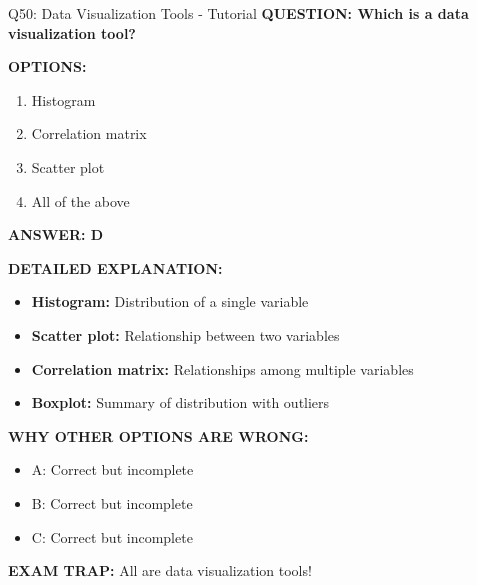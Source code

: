 \documentclass[8pt]{beamer}
\begin{document}
	\begin{frame}{Q50: Data Visualization Tools - Tutorial}
		\fontsize{6.5}{7.5}\selectfont
		\textbf{QUESTION: Which is a data visualization tool?}
		
		\vspace{0.1cm}
		\textbf{OPTIONS:}
		\begin{enumerate}
			\item Histogram
			\item Correlation matrix
			\item Scatter plot
			\item All of the above
		\end{enumerate}
		
		\vspace{0.1cm}
		\textcolor{myblue}{\textbf{ANSWER: D}}
		
		\vspace{0.1cm}
		\textbf{DETAILED EXPLANATION:}
		\begin{itemize}
			\item \textbf{Histogram:} Distribution of a single variable
			\item \textbf{Scatter plot:} Relationship between two variables
			\item \textbf{Correlation matrix:} Relationships among multiple variables
			\item \textbf{Boxplot:} Summary of distribution with outliers
		\end{itemize}
		
		\vspace{0.1cm}
		\textcolor{myred}{\textbf{WHY OTHER OPTIONS ARE WRONG:}}
		\begin{itemize}
			\item \textcolor{myred}{A:} Correct but incomplete
			\item \textcolor{myred}{B:} Correct but incomplete
			\item \textcolor{myred}{C:} Correct but incomplete
		\end{itemize}
		
		\textcolor{myred}{\textbf{EXAM TRAP:}} All are \textcolor{myblue}{data visualization tools}!
	\end{frame}
	
\end{document}
